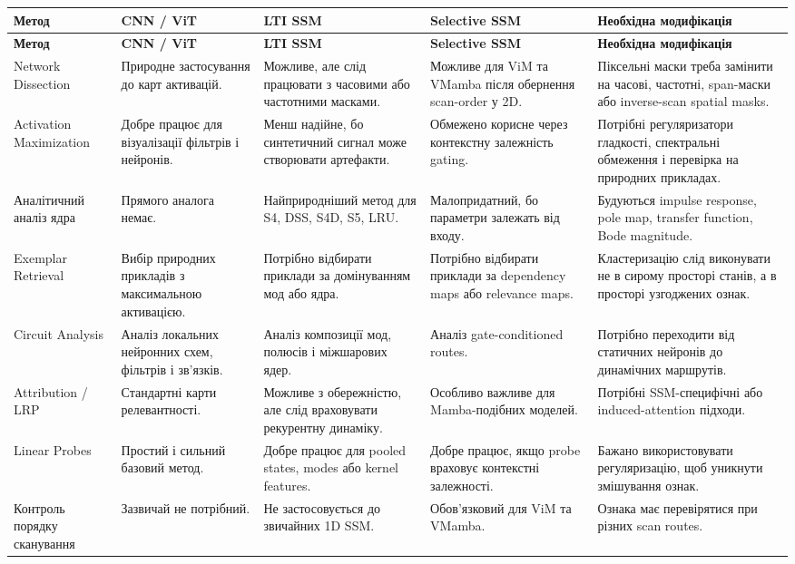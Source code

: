 \documentclass[12pt,a4paper]{article}
\begin{document}
\begin{longtable}{p{3.2cm} p{2.7cm} p{3cm} p{3cm} p{4.2cm}}
\toprule
\textbf{Метод}
&
\textbf{CNN / ViT}
&
\textbf{LTI SSM}
&
\textbf{Selective SSM}
&
\textbf{Необхідна модифікація}
\\
\midrule
\endfirsthead

\toprule
\textbf{Метод}
&
\textbf{CNN / ViT}
&
\textbf{LTI SSM}
&
\textbf{Selective SSM}
&
\textbf{Необхідна модифікація}
\\
\midrule
\endhead

Network Dissection
&
Природне застосування до карт активацій.
&
Можливе, але слід працювати з часовими або частотними масками.
&
Можливе для ViM та VMamba після обернення scan-order у 2D.
&
Піксельні маски треба замінити на часові, частотні, span-маски або
inverse-scan spatial masks.
\\

Activation Maximization
&
Добре працює для візуалізації фільтрів і нейронів.
&
Менш надійне, бо синтетичний сигнал може створювати артефакти.
&
Обмежено корисне через контекстну залежність gating.
&
Потрібні регуляризатори гладкості, спектральні обмеження і перевірка
на природних прикладах.
\\

Аналітичний аналіз ядра
&
Прямого аналога немає.
&
Найприродніший метод для S4, DSS, S4D, S5, LRU.
&
Малопридатний, бо параметри залежать від входу.
&
Будуються impulse response, pole map, transfer function, Bode magnitude.
\\

Exemplar Retrieval
&
Вибір природних прикладів з максимальною активацією.
&
Потрібно відбирати приклади за домінуванням мод або ядра.
&
Потрібно відбирати приклади за dependency maps або relevance maps.
&
Кластеризацію слід виконувати не в сирому просторі станів, а в просторі
узгоджених ознак.
\\

Circuit Analysis
&
Аналіз локальних нейронних схем, фільтрів і зв'язків.
&
Аналіз композиції мод, полюсів і міжшарових ядер.
&
Аналіз gate-conditioned routes.
&
Потрібно переходити від статичних нейронів до динамічних маршрутів.
\\

Attribution / LRP
&
Стандартні карти релевантності.
&
Можливе з обережністю, але слід враховувати рекурентну динаміку.
&
Особливо важливе для Mamba-подібних моделей.
&
Потрібні SSM-специфічні або induced-attention підходи.
\\

Linear Probes
&
Простий і сильний базовий метод.
&
Добре працює для pooled states, modes або kernel features.
&
Добре працює, якщо probe враховує контекстні залежності.
&
Бажано використовувати регуляризацію, щоб уникнути змішування ознак.
\\

Контроль порядку сканування
&
Зазвичай не потрібний.
&
Не застосовується до звичайних 1D SSM.
&
Обов'язковий для ViM та VMamba.
&
Ознака має перевірятися при різних scan routes.
\\
\bottomrule
\end{longtable}
\end{document}
